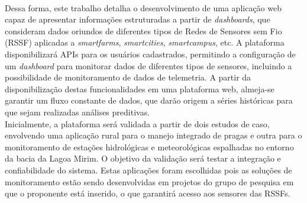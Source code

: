 \documentclass[tcc-proposta]{texufpel}
\begin{document}
\\

Dessa forma, este trabalho detalha o desenvolvimento de uma aplicação web capaz de apresentar informações estruturadas a partir de \textit{dashboards}, que consideram dados oriundos de diferentes tipos de Redes de Sensores sem Fio (RSSF) aplicadas a \textit{smartfarms}, \textit{smartcities}, \textit{smartcampus}, etc. A plataforma disponibilizará APIs para os usuários cadastrados, permitindo a configuração de um \textit{dashboard} para monitorar dados de diferentes tipos de sensores, incluindo a possibilidade de monitoramento de dados de telemetria. A partir da disponibilização destas funcionalidades em uma plataforma web, almeja-se garantir um fluxo constante de dados, que darão origem a séries históricas para que sejam realizadas análises preditivas. \\

Inicialmente, a plataforma será validada a partir de dois estudos de caso, envolvendo uma aplicação rural para o manejo integrado de pragas e outra para o monitoramento de estações hidrológicas e meteorológicas espalhadas no entorno da bacia da Lagoa Mirim. O objetivo da validação será testar a integração e confiabilidade do sistema. Estas aplicações foram escolhidas pois as soluções de monitoramento estão sendo desenvolvidas em projetos do grupo de pesquisa em que o proponente está inserido, o que garantirá acesso aos sensores das RSSFs.



\end{document}
